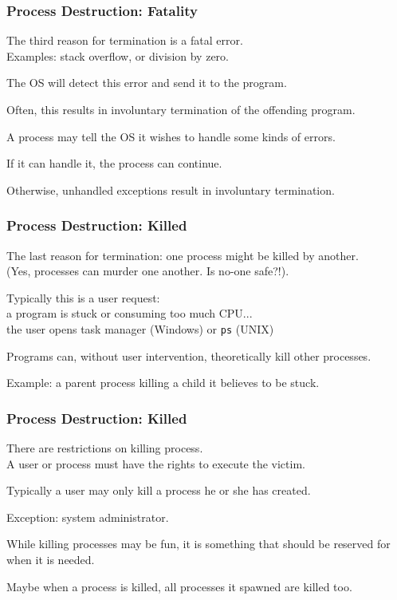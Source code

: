 \begin{frame}
	\frametitle{Process Destruction: Fatality}

	The third reason for termination is a fatal error.\\
	\quad Examples: stack overflow, or division by zero.

	The OS will detect this error and send it to the program.

	Often, this results in involuntary termination of the offending program.

	A process may tell the OS it wishes to handle some kinds of errors.

	If it can handle it, the process can continue.

	Otherwise, unhandled exceptions result in involuntary termination.

\end{frame}

\begin{frame}
	\frametitle{Process Destruction: Killed}

	The last reason for termination: one process might be killed by another.\\
	\quad (Yes, processes can murder one another. Is no-one safe?!).

	Typically this is a user request:\\
	\quad a program is stuck or consuming too much CPU...\\
	\quad the user opens task manager (Windows) or \texttt{ps} (UNIX)

	Programs can, without user intervention, theoretically kill other processes.

	Example: a parent process killing a child it believes to be stuck.

\end{frame}

\begin{frame}
	\frametitle{Process Destruction: Killed}

	There are restrictions on killing process.\\
	\quad A user or process must have the rights to execute the victim.

	Typically a user may only kill a process he or she has created.

	Exception: system administrator.

	While killing processes may be fun, it is something that should be reserved for when it is needed.

	Maybe when a process is killed, all processes it spawned are killed too.


\end{frame}


